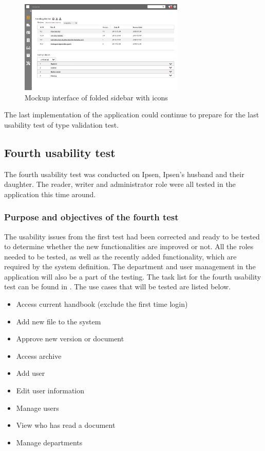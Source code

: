 \documentclass[../../master.tex]{subfiles}
\begin{document}
\begin{figure}[H]
	\centering
		\includegraphics[width=0.7\textwidth]{billeder/ForsideFoldedSidebar.jpg}
	\caption{Mockup interface of folded sidebar with icons}\label{fig:mockupSidebarIcon}
\end{figure}

The last implementation of the application could continue to prepare for the last usability test of type validation test.

\subsection{Fourth usability test}\label{fourthtest}
The fourth usability test was conducted on Ipsen, Ipsen's husband and their daughter.
The reader, writer and administrator role were all tested in the application this time around.

\subsubsection*{Purpose and objectives of the fourth test}
The usability issues from the first test had been corrected and ready to be tested to determine whether the new functionalities are improved or not.
All the roles needed to be tested, as well as the recently added functionality, which are required by the system definition.
The department and user management in the application will also be a part of the testing.
The task list for the fourth usability test can be found in .
The use cases that will be tested are listed below.

\begin{itemize}
	\item Access current handbook (exclude the first time login)
	\item Add new file to the system
	\item Approve new version or document
	\item Access archive
	\item Add user
	\item Edit user information
	\item Manage users
	\item View who has read a document
	\item Manage departments
\end{itemize}
\end{document}
